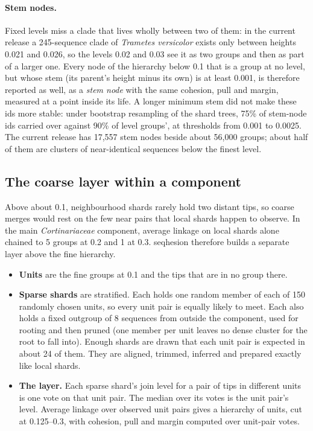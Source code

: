 \documentclass[11pt,a4paper]{article}
\newcommand{\seqhesion}{\textsf{seqhesion}}
\begin{document}
\paragraph{Stem nodes.}
Fixed levels miss a clade that lives wholly between two of them: in the current release a
245-sequence clade of \emph{Trametes versicolor} exists only between heights 0.021 and 0.026, so the
levels 0.02 and 0.03 see it as two groups and then as part of a larger one. Every node of the
hierarchy below 0.1 that is a group at no level, but whose stem (its parent's height minus its own)
is at least 0.001, is therefore reported as well, as a \emph{stem node} with the same cohesion,
pull and margin, measured at a point inside its life. A longer minimum stem did not make these ids
more stable: under bootstrap resampling of the shard trees, 75\% of stem-node ids carried over
against 90\% of level groups', at thresholds from 0.001 to 0.0025. The current release has 17{,}557
stem nodes beside about 56{,}000 groups; about half of them are clusters of near-identical sequences
below the finest level.

\subsection{The coarse layer within a component}\label{sec:coarse}

Above about 0.1, neighbourhood shards rarely hold two distant tips, so coarse merges would rest on
the few near pairs that local shards happen to observe. In the main \emph{Cortinariaceae}
component, average linkage on local shards alone chained to 5 groups at 0.2 and 1 at 0.3.
\seqhesion{} therefore builds a separate layer above the fine hierarchy.
\begin{itemize}
  \item \textbf{Units} are the fine groups at 0.1 and the tips that are in no group there.
  \item \textbf{Sparse shards} are stratified. Each holds one random member of each of 150 randomly
        chosen units, so every unit pair is equally likely to meet. Each also holds a fixed outgroup
        of 8 sequences from outside the component, used for rooting and then pruned (one member per
        unit leaves no dense cluster for the root to fall into). Enough shards
        are drawn that each unit pair is expected in about 24 of them. They are aligned, trimmed,
        inferred and prepared exactly like local shards.
  \item \textbf{The layer.} Each sparse shard's join level for a pair of tips in different units is
        one vote on that unit pair. The median over its votes is the unit pair's level. Average
        linkage over observed unit pairs gives a hierarchy of units, cut at 0.125--0.3, with
        cohesion, pull and margin computed over unit-pair votes.
\end{itemize}
\end{document}
